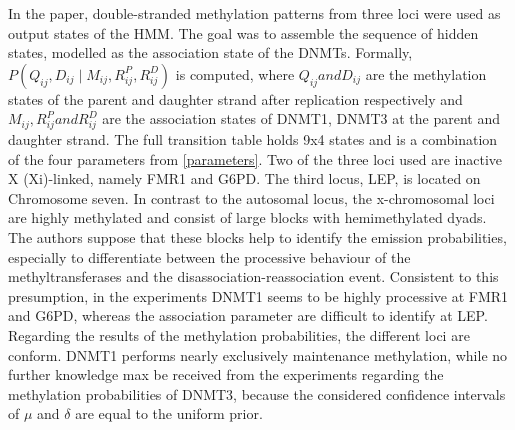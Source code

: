 In the paper, double-stranded methylation patterns from three loci were used as output states of the \ac{HMM}. The goal was to assemble the sequence of hidden states, modelled as the association state of the \acp{DNMT}. Formally, $P(Q_{ij},D_{ij}\mid M_{ij},R_{ij}^P,R_{ij}^D)$ is computed, where $Q_{ij} and D_{ij}$ are the methylation states of the parent and daughter strand after replication respectively and  $M_{ij},R_{ij}^P and R_{ij}^D$ are the association states of DNMT1, DNMT3 at the parent and daughter strand. The full transition table holds 9x4 states and is a combination of the four parameters from \ref{parameters}.\cite{Fu}\newline
Two of the three loci used are inactive X (Xi)-linked, namely FMR1 and G6PD. The third locus, LEP, is located on Chromosome seven. In contrast to the autosomal locus, the x-chromosomal loci are highly methylated and consist of large blocks with hemimethylated dyads. The authors suppose that these blocks help to identify the emission probabilities, especially to differentiate between the processive behaviour of the methyltransferases and the disassociation-reassociation event. Consistent to this presumption, in the experiments DNMT1 seems to be highly processive at FMR1 and G6PD, whereas the association parameter are difficult to identify at LEP. Regarding the results of the methylation probabilities, the different loci are conform. DNMT1 performs nearly exclusively maintenance methylation, while no further knowledge max be received from the experiments regarding the methylation probabilities of DNMT3, because the considered confidence intervals of $\mu$ and $\delta$ are equal to the uniform prior.